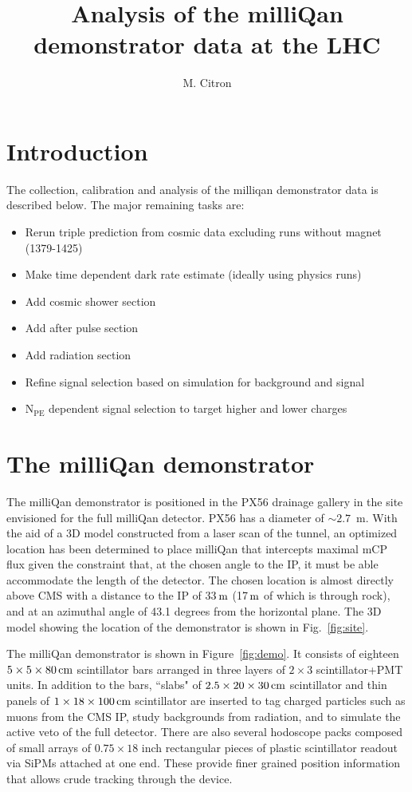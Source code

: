 \documentclass[12pt]{article}
\title{Analysis of the milliQan demonstrator data at the LHC}
\author{M. Citron}
\newcommand{\unit}[1]{\ensuremath{\text{\,#1}}\xspace}
\newcommand{\npe} {\mbox{\ensuremath{\textrm{N}_\textrm{PE}}}\xspace}
\begin{document}
\maketitle

\section{Introduction}

The collection, calibration and analysis of the milliqan demonstrator data is described below.
The major remaining tasks are:
\begin{itemize}
    \item Rerun triple prediction from cosmic data excluding runs without magnet (1379-1425)
    \item Make time dependent dark rate estimate (ideally using physics runs)
    \item Add cosmic shower section
    \item Add after pulse section
    \item Add radiation section
    \item Refine signal selection based on simulation for background and signal
    \item \npe dependent signal selection to target higher and lower charges
\end{itemize}

\section{The milliQan demonstrator}

The milliQan demonstrator is positioned in the PX56 drainage gallery in
the site envisioned for the full milliQan detector. PX56 has a diameter of $\sim 2.7$~m. 
With the aid of a 3D model constructed from a laser scan of the tunnel, 
an optimized location has been determined to place milliQan 
that intercepts maximal mCP flux given the constraint that, at the 
chosen angle to the IP, it must be able accommodate the length of the detector. 
The chosen location is almost directly above CMS with a distance to the IP of 
33\unit{m} (17\unit{m} of which is through rock), and at an azimuthal angle of 
43.1 degrees from the horizontal plane. The 3D model showing the location 
of the demonstrator is shown in Fig.~\ref{fig:site}.

The milliQan demonstrator is shown in Figure~\ref{fig:demo}. It
consists of eighteen $5\times5\times80\unit{cm}$ scintillator bars arranged in three layers of 
$2\times3$ scintillator+PMT units. In addition to the bars, ``slabs" of $2.5 \times 20 \times 30\unit{cm}$ 
scintillator and thin panels of $1 \times 18 \times 100\unit{cm}$ scintillator are 
inserted to tag charged particles such as muons from the CMS IP, study backgrounds 
from radiation, and to simulate the active veto of the full detector. There are also 
several hodoscope packs composed of small arrays of $0.75 \times 18$ inch rectangular 
pieces of plastic scintillator readout via SiPMs attached at one end. These provide 
finer grained position information that allows crude tracking through the device. 
\end{document}
